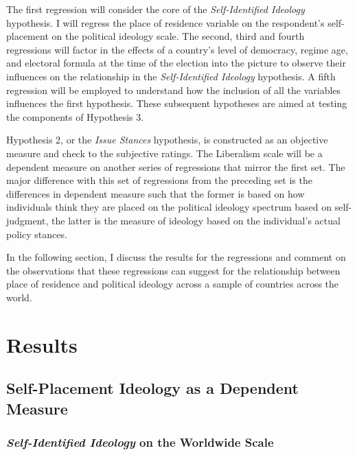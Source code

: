 \documentclass[12pt, titlepage]{article}
\newcommand\e{\emph}
\begin{document}
The first regression will consider the core of the \e{Self-Identified Ideology} hypothesis. I will regress the place of residence variable on the respondent's self-placement on the political ideology scale. The second, third and fourth regressions will factor in the effects of a country's level of democracy, regime age, and electoral formula at the time of the election into the picture to observe their influences on the relationship in the \e{Self-Identified Ideology} hypothesis. A fifth regression will be employed to understand how the inclusion of all the variables influences the first hypothesis. These subsequent hypotheses are aimed at testing the components of Hypothesis 3.

Hypothesis 2, or the \e{Issue Stances} hypothesis, is constructed as an objective measure and check to the subjective ratings. The Liberalism scale will be a dependent measure on another series of regressions that mirror the first set. The major difference with this set of regressions from the preceding set is the differences in dependent measure such that the former is based on how individuals think they are placed on the political ideology spectrum based on self-judgment, the latter is the measure of ideology based on the individual's actual policy stances.

In the following section, I discuss the results for the regressions and comment on the observations that these regressions can suggest for the relationship between place of residence and political ideology across a sample of countries across the world.

\section{Results}

\subsection{Self-Placement Ideology as a Dependent Measure}

\subsubsection{\e{Self-Identified Ideology} on the Worldwide Scale}
\end{document}
